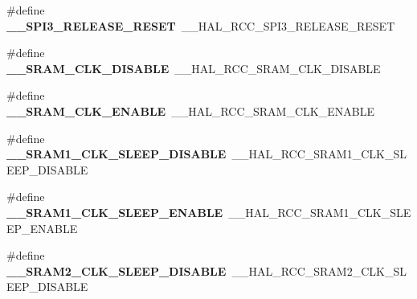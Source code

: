 \begin{DoxyCompactItemize}
\item 
\#define {\bfseries \+\_\+\+\_\+\+S\+P\+I3\+\_\+\+R\+E\+L\+E\+A\+S\+E\+\_\+\+R\+E\+S\+ET}~\+\_\+\+\_\+\+H\+A\+L\+\_\+\+R\+C\+C\+\_\+\+S\+P\+I3\+\_\+\+R\+E\+L\+E\+A\+S\+E\+\_\+\+R\+E\+S\+ET\hypertarget{group___h_a_l___r_c_c___aliased_ga1f3cef9cff8877c578e230b3518f041d}{}\label{group___h_a_l___r_c_c___aliased_ga1f3cef9cff8877c578e230b3518f041d}

\item 
\#define {\bfseries \+\_\+\+\_\+\+S\+R\+A\+M\+\_\+\+C\+L\+K\+\_\+\+D\+I\+S\+A\+B\+LE}~\+\_\+\+\_\+\+H\+A\+L\+\_\+\+R\+C\+C\+\_\+\+S\+R\+A\+M\+\_\+\+C\+L\+K\+\_\+\+D\+I\+S\+A\+B\+LE\hypertarget{group___h_a_l___r_c_c___aliased_gac14e78a1860eadfef155f497a8660b6b}{}\label{group___h_a_l___r_c_c___aliased_gac14e78a1860eadfef155f497a8660b6b}

\item 
\#define {\bfseries \+\_\+\+\_\+\+S\+R\+A\+M\+\_\+\+C\+L\+K\+\_\+\+E\+N\+A\+B\+LE}~\+\_\+\+\_\+\+H\+A\+L\+\_\+\+R\+C\+C\+\_\+\+S\+R\+A\+M\+\_\+\+C\+L\+K\+\_\+\+E\+N\+A\+B\+LE\hypertarget{group___h_a_l___r_c_c___aliased_gabb6fb0307de12ccb1d30d2a167f2e4bb}{}\label{group___h_a_l___r_c_c___aliased_gabb6fb0307de12ccb1d30d2a167f2e4bb}

\item 
\#define {\bfseries \+\_\+\+\_\+\+S\+R\+A\+M1\+\_\+\+C\+L\+K\+\_\+\+S\+L\+E\+E\+P\+\_\+\+D\+I\+S\+A\+B\+LE}~\+\_\+\+\_\+\+H\+A\+L\+\_\+\+R\+C\+C\+\_\+\+S\+R\+A\+M1\+\_\+\+C\+L\+K\+\_\+\+S\+L\+E\+E\+P\+\_\+\+D\+I\+S\+A\+B\+LE\hypertarget{group___h_a_l___r_c_c___aliased_ga0d71b1d9473d534a251bf5aa021d34c6}{}\label{group___h_a_l___r_c_c___aliased_ga0d71b1d9473d534a251bf5aa021d34c6}

\item 
\#define {\bfseries \+\_\+\+\_\+\+S\+R\+A\+M1\+\_\+\+C\+L\+K\+\_\+\+S\+L\+E\+E\+P\+\_\+\+E\+N\+A\+B\+LE}~\+\_\+\+\_\+\+H\+A\+L\+\_\+\+R\+C\+C\+\_\+\+S\+R\+A\+M1\+\_\+\+C\+L\+K\+\_\+\+S\+L\+E\+E\+P\+\_\+\+E\+N\+A\+B\+LE\hypertarget{group___h_a_l___r_c_c___aliased_ga790fe597a6e1fbe314256d83534bc539}{}\label{group___h_a_l___r_c_c___aliased_ga790fe597a6e1fbe314256d83534bc539}

\item 
\#define {\bfseries \+\_\+\+\_\+\+S\+R\+A\+M2\+\_\+\+C\+L\+K\+\_\+\+S\+L\+E\+E\+P\+\_\+\+D\+I\+S\+A\+B\+LE}~\+\_\+\+\_\+\+H\+A\+L\+\_\+\+R\+C\+C\+\_\+\+S\+R\+A\+M2\+\_\+\+C\+L\+K\+\_\+\+S\+L\+E\+E\+P\+\_\+\+D\+I\+S\+A\+B\+LE\hypertarget{group___h_a_l___r_c_c___aliased_ga1459281323d5a30163aa6ef88e4dc18e}{}\label{group___h_a_l___r_c_c___aliased_ga1459281323d5a30163aa6ef88e4dc18e}


\end{DoxyCompactItemize}
